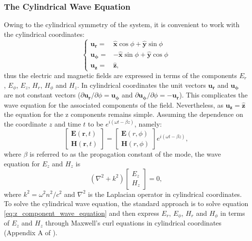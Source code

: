 \subsubsection{The Cylindrical Wave Equation}
Owing to the cylindrical symmetry of the system, it is convenient to work with the cylindrical coordinates:
\begin{equation}
    \begin{cases}
        \mathbf{u_r}    = & \hat{\mathbf{x}}\cos\phi  + \hat{\mathbf{y}}\sin\phi  \\
        \mathbf{u_\phi} = & - \hat{\mathbf{x}}\sin\phi + \hat{\mathbf{y}}\cos\phi \\
        \mathbf{u_z}    = & \hat{\mathbf{z}},
    \end{cases}
\end{equation}
thus the electric and magnetic fields are expressed in terms of the components $E_r$, $E_\phi$, $E_z$, $H_r$, $H_\phi$ and $H_z$. In cylindrical coordinates the unit vectors $\mathbf{u_r}$ and $\mathbf{u_\phi}$ are not constant vectors ($\partial\mathbf{u_r}/\partial \phi = \mathbf{u_\phi}$ and $\partial \mathbf{u_\phi} /\partial \phi = -\mathbf{u_r}$). This complicates the wave equation for the associated components of the field. Nevertheless, as $\mathbf{u_z}=\mathbf{\hat{z}}$ the equation for the z components remains simple. Assuming the dependence on the coordinate $z$ and time $t$ to be $e^{i(\omega t-\beta z)}$, namely:
\begin{equation}
    \label{eq:z_field}
    \begin{bmatrix}
        \mathbf{E}(\mathbf{r},t) \\
        \mathbf{H}(\mathbf{r},t)
    \end{bmatrix}
    =
    \begin{bmatrix}
        \mathbf{E}(r, \phi) \\
        \mathbf{H}(r, \phi)
    \end{bmatrix}
    e^{i(\omega t -\beta z)},
\end{equation}
where $\beta$ is referred to as the propagation constant of the mode,
the wave equation for $E_z$ and $H_z$ is
\begin{equation}
    \label{eq:z_component_wave_equation}
    (\nabla^2 + k^2)
    \begin{bmatrix}
        E_z \\
        H_z
    \end{bmatrix}
    =0,
\end{equation}
where $k^2=\omega^2n^2/c^2$ and $\nabla^2$ is the Laplacian operator in cylindrical coordinates.
To solve the cylindrical wave equation, the standard approach is to solve equation \eqref{eq:z_component_wave_equation} and then express $E_r$, $E_\phi$, $H_r$ and $H_\phi$ in terms of $E_z$ and $H_z$ through Maxwell's curl equations in cylindrical coordinates (Appendix A of \cite{yariv2007photonics}).

